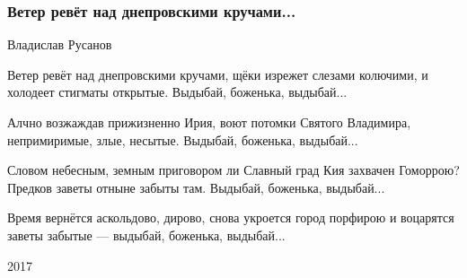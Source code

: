  
 
 

\subsubsection{Ветер ревёт над днепровскими кручами...}

Владислав Русанов

Ветер ревёт над днепровскими кручами,
щёки изрежет слезами колючими,
и холодеет стигматы открытые.
Выдыбай, боженька, выдыбай...

Алчно возжаждав прижизненно Ирия,
воют потомки Святого Владимира,
непримиримые, злые, несытые.
Выдыбай, боженька, выдыбай...

Словом небесным, земным приговором ли
Славный град Кия захвачен Гоморрою?
Предков заветы отныне забыты там.
Выдыбай, боженька, выдыбай...

Время вернётся аскольдово, дирово,
снова укроется город порфирою
и воцарятся заветы забытые —
выдыбай, боженька, выдыбай...

2017
